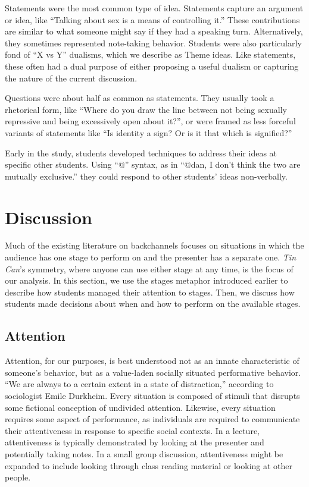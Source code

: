 Statements were the most common type of idea. Statements capture an argument or idea, like ``Talking about sex is a means of controlling it.'' These contributions are similar to what someone might say if they had a speaking turn. Alternatively, they sometimes represented note-taking behavior. Students were also particularly fond of ``X vs Y'' dualisms, which we describe as Theme ideas. Like statements, these often had a dual purpose of either proposing a useful dualism or capturing the nature of the current discussion. 

Questions were about half as common as statements. They usually took a rhetorical form, like ``Where do you draw the line between not being sexually repressive and being excessively open about it?'', or were framed as less forceful variants of statements like ``Is identity a sign? Or is it that which is signified?''

Early in the study, students developed techniques to address their ideas at specific other students. Using ``@'' syntax, as in ``@dan, I don't think the two are mutually exclusive.'' they could respond to other students' ideas non-verbally.


\section{Discussion}
Much of the existing literature on backchannels focuses on situations in which the audience has one stage to perform on and the presenter has a separate one.  \citep{Yardi:2006uk, mccarthy_digital_2004} \emph{Tin Can}'s symmetry, where anyone can use either stage at any time, is the focus of our analysis. In this section, we use the stages metaphor introduced earlier to describe how students managed their attention to stages. Then, we discuss how students made decisions about when and how to perform on the available stages. 

\subsection{Attention}
Attention, for our purposes, is best understood not as an innate characteristic of someone's behavior, but as a value-laden socially situated performative behavior. ``We are always to a certain extent in a state of distraction,'' according to sociologist Emile Durkheim. \citep{Durkheim:1974tc} Every situation is composed of stimuli that disrupts some fictional conception of undivided attention.  Likewise, every situation requires some aspect of performance, as individuals are required to communicate their attentiveness in response to specific social contexts. In a lecture, attentiveness is typically demonstrated by looking at the presenter and potentially taking notes. In a small group discussion, attentiveness might be expanded to include looking through class reading material or looking at other people. 

